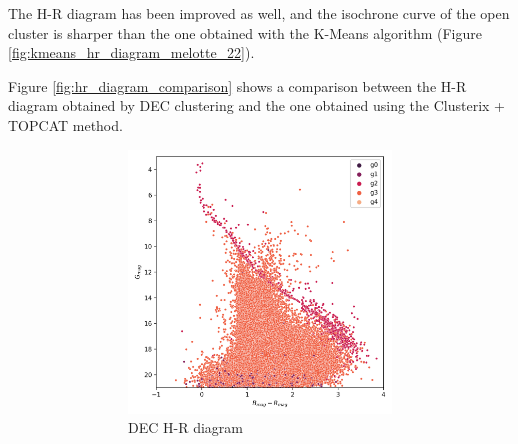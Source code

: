 \documentclass[11pt, a4paper, english]{book}
\begin{document}
The H-R diagram has been improved as well,
and the isochrone curve of the open cluster is sharper than the one obtained with the K-Means algorithm
(Figure \ref{fig:kmeans_hr_diagram_melotte_22}).

Figure \ref{fig:hr_diagram_comparison} shows a comparison between the H-R diagram obtained
by DEC clustering and the one obtained using the Clusterix + TOPCAT method.

\begin{figure}[htbp]
  \centering
  \begin{subfigure}{0.9\textwidth}
    \centering
    \begin{subfigure}[t]{0.45\textwidth}
      \centering
      \includegraphics[width=\textwidth]{../figures/melotte_22/dec_hr_diagram_melotte_22.png}
      \caption{DEC H-R diagram}
    \end{subfigure}
    \hfill
    \begin{subfigure}[t]{0.45\textwidth}
      \centering

\end{subfigure}
\end{subfigure}
\end{figure}
\end{document}
